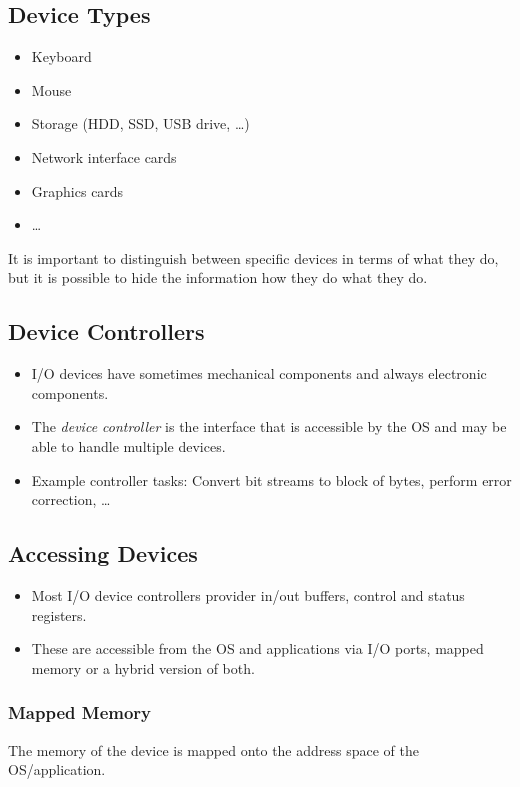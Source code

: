 		\subsection{Device Types}
			\begin{itemize}
				\item Keyboard
				\item Mouse
				\item Storage (HDD, SSD, USB drive, \dots)
				\item Network interface cards
				\item Graphics cards
				\item \dots
			\end{itemize}

			It is important to distinguish between specific devices in terms of what they do, but it is possible to hide the information how they do what they do.

		\subsection{Device Controllers}
			\begin{itemize}
				\item I/O devices have sometimes mechanical components and always electronic components.
				\item The \textit{device controller} is the interface that is accessible by the OS and may be able to handle multiple devices.
				\item Example controller tasks: Convert bit streams to block of bytes, perform error correction, \dots
			\end{itemize}

		\subsection{Accessing Devices}
			\begin{itemize}
				\item Most I/O device controllers provider in/out buffers, control and status registers.
				\item These are accessible from the OS and applications via I/O ports, mapped memory or a hybrid version of both.
			\end{itemize}

			\subsubsection{Mapped Memory}
				The memory of the device is mapped onto the address space of the OS/application.

